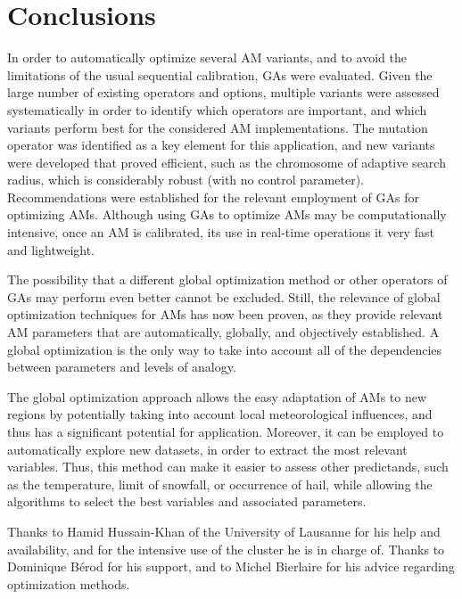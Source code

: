 \documentclass{ametsoc}
\begin{document}
\section{Conclusions}
\label{sec:conclusions}

In order to automatically optimize several AM variants, and to avoid the limitations of the usual sequential calibration, GAs were evaluated. Given the large number of existing operators and options, multiple variants were assessed systematically in order to identify which operators are important, and which variants perform best for the considered AM implementations. The mutation operator was identified as a key element for this application, and new variants were developed that proved efficient, such as the chromosome of adaptive search radius, which is considerably robust (with no control parameter). Recommendations were established for the relevant employment of GAs for optimizing AMs. Although using GAs to optimize AMs may be computationally intensive, once an AM is calibrated, its use in real-time operations it very fast and lightweight.

The possibility that a different global optimization method or other operators of GAs may perform even better cannot be excluded. Still, the relevance of global optimization techniques for AMs has now been proven, as they provide relevant AM parameters that are automatically, globally, and objectively established. A global optimization is the only way to take into account all of the dependencies between parameters and levels of analogy.

The global optimization approach allows the easy adaptation of AMs to new regions by potentially taking into account local meteorological influences, and thus has a significant potential for application. Moreover, it can be employed to automatically explore new datasets, in order to extract the most relevant variables. Thus, this method can make it easier to assess other predictands, such as the temperature, limit of snowfall, or occurrence of hail, while allowing the algorithms to select the best variables and associated parameters.


%
\acknowledgments
Thanks to Hamid Hussain-Khan of the University of Lausanne for his help and availability, and for the intensive use of the cluster he is in charge of. Thanks to Dominique B\'{e}rod for his support, and to Michel Bierlaire for his advice regarding optimization methods.
\end{document}
